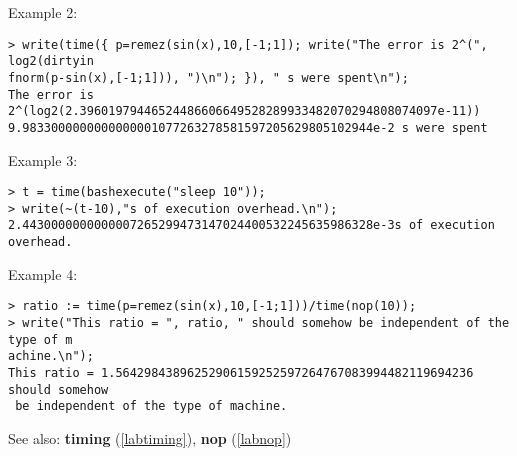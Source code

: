 \noindent Example 2: 
\begin{center}\begin{minipage}{15cm}\begin{Verbatim}[frame=single]
> write(time({ p=remez(sin(x),10,[-1;1]); write("The error is 2^(", log2(dirtyin
fnorm(p-sin(x),[-1;1])), ")\n"); }), " s were spent\n");
The error is 2^(log2(2.39601979446524486606649528289933482070294808074097e-11))
9.9833000000000000001077263278581597205629805102944e-2 s were spent
\end{Verbatim}
\end{minipage}\end{center}
\noindent Example 3: 
\begin{center}\begin{minipage}{15cm}\begin{Verbatim}[frame=single]
> t = time(bashexecute("sleep 10"));
> write(~(t-10),"s of execution overhead.\n");
2.4430000000000007265299473147024400532245635986328e-3s of execution overhead.
\end{Verbatim}
\end{minipage}\end{center}
\noindent Example 4: 
\begin{center}\begin{minipage}{15cm}\begin{Verbatim}[frame=single]
> ratio := time(p=remez(sin(x),10,[-1;1]))/time(nop(10));
> write("This ratio = ", ratio, " should somehow be independent of the type of m
achine.\n");
This ratio = 1.56429843896252906159252597264767083994482119694236 should somehow
 be independent of the type of machine.
\end{Verbatim}
\end{minipage}\end{center}
See also: \textbf{timing} (\ref{labtiming}), \textbf{nop} (\ref{labnop})

